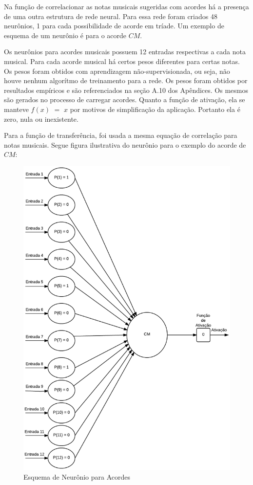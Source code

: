 Na função de correlacionar as notas musicais sugeridas com acordes há a presença de uma outra estrutura de rede neural. Para essa rede foram criados 48 neurônios, 1 para cada possibilidade de acorde em tríade. Um exemplo de esquema de um neurônio é para o acorde $CM$.

Os neurônios para acordes musicais possuem 12 entradas respectivas a cada nota musical. Para cada acorde musical há certos pesos diferentes para certas notas. Os pesos foram obtidos com aprendizagem não-supervisionada, ou seja, não houve nenhum algorítmo de treinamento para a rede. Os pesos foram obtidos por resultados empíricos e são referenciados na seção A.10 dos Apêndices. Os mesmos são gerados no processo de carregar acordes. Quanto a função de ativação, ela se manteve $f(x)$ $=$ $x$ por motivos de simplificação da aplicação. Portanto ela é zero, nula ou inexistente.

Para a função de transferência, foi usada a mesma equação de correlação para notas musicais. Segue figura ilustrativa do neurônio para o exemplo do acorde de $CM$:

\begin{figure}[t]
	\centering
		\includegraphics[keepaspectratio=true,scale=0.25]{figuras/neuron_chord}
	\caption{Esquema de Neurônio para Acordes}
\end{figure}



